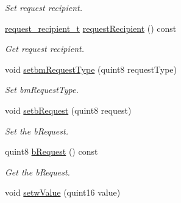 \begin{DoxyCompactItemize}
\begin{DoxyCompactList}\small\item\em Set request recipient. \end{DoxyCompactList}\item 
\hyperlink{classmdt_frame_usb_control_aaf1f08b1b5e47ab18426800ed0accbde}{request\_\-recipient\_\-t} \hyperlink{classmdt_frame_usb_control_aeb7b5844c0a025ff6692b3724a21a2a4}{requestRecipient} () const 
\begin{DoxyCompactList}\small\item\em Get request recipient. \end{DoxyCompactList}\item 
\hypertarget{classmdt_frame_usb_control_a62121aef1ceb3dd04c78c2fe91b86a4f}{
void \hyperlink{classmdt_frame_usb_control_a62121aef1ceb3dd04c78c2fe91b86a4f}{setbmRequestType} (quint8 requestType)}
\label{classmdt_frame_usb_control_a62121aef1ceb3dd04c78c2fe91b86a4f}

\begin{DoxyCompactList}\small\item\em Set bmRequestType. \end{DoxyCompactList}\item 
\hypertarget{classmdt_frame_usb_control_a308340318fd79b4d34d887a026e6e652}{
void \hyperlink{classmdt_frame_usb_control_a308340318fd79b4d34d887a026e6e652}{setbRequest} (quint8 request)}
\label{classmdt_frame_usb_control_a308340318fd79b4d34d887a026e6e652}

\begin{DoxyCompactList}\small\item\em Set the bRequest. \end{DoxyCompactList}\item 
\hypertarget{classmdt_frame_usb_control_ab4c57d23805b5ef21a571d200109b403}{
quint8 \hyperlink{classmdt_frame_usb_control_ab4c57d23805b5ef21a571d200109b403}{bRequest} () const }
\label{classmdt_frame_usb_control_ab4c57d23805b5ef21a571d200109b403}

\begin{DoxyCompactList}\small\item\em Get the bRequest. \end{DoxyCompactList}\item 
\hypertarget{classmdt_frame_usb_control_a9200179b1a6ac8edf75897f5dfcd4ed4}{
void \hyperlink{classmdt_frame_usb_control_a9200179b1a6ac8edf75897f5dfcd4ed4}{setwValue} (quint16 value)}
\label{classmdt_frame_usb_control_a9200179b1a6ac8edf75897f5dfcd4ed4}


\end{DoxyCompactItemize}
